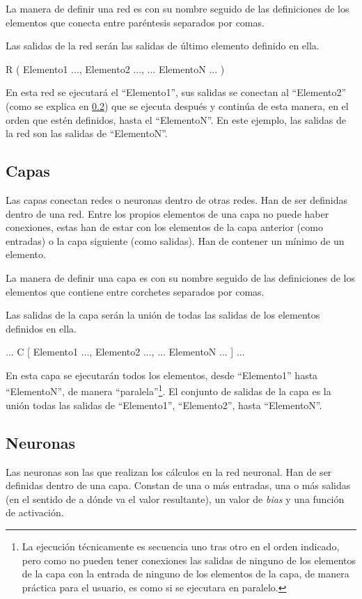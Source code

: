 \documentclass[a4paper]{article}
\begin{document}
La manera de definir una red es con su nombre seguido de las definiciones de los elementos que conecta entre paréntesis separados por comas.

Las salidas de la red serán las salidas de último elemento definido en ella.

\begin{codebox}
R (
	Elemento1 ...,
	Elemento2 ...,
	...
	ElementoN ...
)
\end{codebox}

En esta red se ejecutará el ``Elemento1'', sus salidas se conectan al ``Elemento2'' (como se explica en \ref{neuronas}) que se ejecuta después y continúa de esta manera, en el orden que estén definidos, hasta el ``ElementoN''. En este ejemplo, las salidas de la red son las salidas de ``ElementoN''.

\subsection{Capas}
Las capas conectan redes o neuronas dentro de otras redes. Han de ser definidas dentro de una red. Entre los propios elementos de una capa no puede haber conexiones, estas han de estar con los elementos de la capa anterior (como entradas) o la capa siguiente (como salidas). Han de contener un mínimo de un elemento.

La manera de definir una capa es con su nombre seguido de las definiciones de los elementos que contiene entre corchetes separados por comas.

Las salidas de la capa serán la unión de todas las salidas de los elementos definidos en ella.

\begin{codebox}
...
C [
	Elemento1 ...,
	Elemento2 ...,
	...
	ElementoN ...
]
...
\end{codebox}

En esta capa se ejecutarán todos los elementos, desde ``Elemento1'' hasta ``ElementoN'', de manera ``paralela''\footnote{La ejecución técnicamente es secuencia uno tras otro en el orden indicado, pero como no pueden tener conexiones las salidas de ninguno de los elementos de la capa con la entrada de ninguno de los elementos de la capa, de manera práctica para el usuario, es como si se ejecutara en paralelo.}. El conjunto de salidas de la capa es la unión todas las salidas de ``Elemento1'', ``Elemento2'', hasta ``ElementoN''.

\subsection{Neuronas}\label{neuronas}
Las neuronas son las que realizan los cálculos en la red neuronal. Han de ser definidas dentro de una capa. Constan de una o más entradas, una o más salidas (en el sentido de a dónde va el valor resultante), un valor de \textit{bias} y una función de activación.
\end{document}
